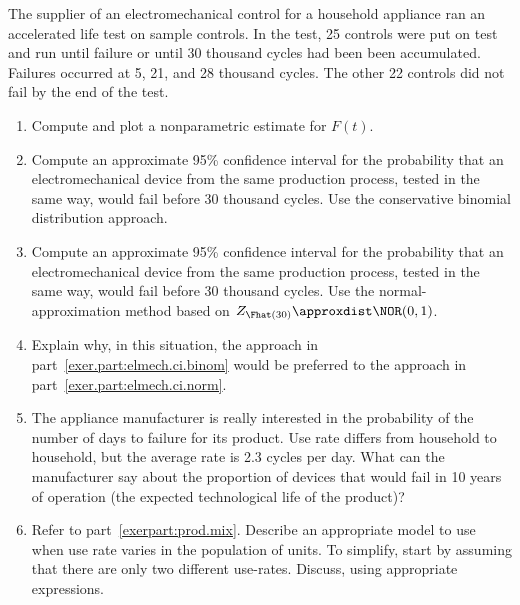\begin{exercise}
The supplier of an electromechanical control for a
household appliance ran an accelerated life
test on sample controls. In the test, 25 controls were put on test and run
until failure or until 30 thousand cycles had been been accumulated.
Failures occurred at 5, 21, and 28 thousand cycles. The other 22
controls did not fail by the end of the test.
\begin{enumerate}
\item
Compute and plot a nonparametric estimate for $F(t)$.
\item
\label{exer.part:elmech.ci.binom}
Compute an approximate 95\% confidence interval for the probability
that an electromechanical device from the same production process,
tested in the same way, would fail before 30 thousand cycles. Use the
conservative binomial distribution approach.
\item
\label{exer.part:elmech.ci.norm}
Compute an approximate 95\% confidence interval for the probability
that an electromechanical device from the same production process,
tested in the same way, would fail before 30 thousand cycles. Use the
normal-approximation method based on $Z_{\Fhat(30)} \approxdist
\NOR(0,1)$.
\item
Explain why, in this situation, the approach in
part~\ref{exer.part:elmech.ci.binom} would be preferred to the
approach in part~\ref{exer.part:elmech.ci.norm}.
\item
\label{exerpart:prod.mix}
The appliance manufacturer is really interested in the
probability of the number of days to failure for its product.
Use rate differs from household to household, but the average rate is
2.3 cycles per day. What can the manufacturer say about the proportion
of devices that would fail in 10 years of operation (the expected
technological life of the product)? 
\item
Refer to part~\ref{exerpart:prod.mix}.
Describe an appropriate model to use when use rate varies in the 
population of units. To simplify, start by assuming that there are
only two different use-rates. Discuss, using appropriate expressions.
\end{enumerate}
\end{exercise}


